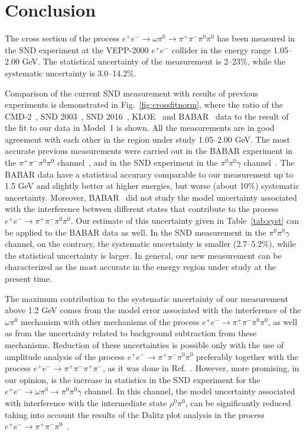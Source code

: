 \documentclass[twocolumn,aps,prd,floatfix,nofootinbib,superscriptaddress]{revtex4-2}
\begin{document}
\section{Conclusion}

The cross section of the process \( e^+e^- \to \omega\pi^0 \to \pi^+\pi^-\pi^0\pi^0 \) has been measured in the SND experiment at the VEPP-2000 $e^+e^-$ collider in the energy range 1.05--2.00 GeV.
The statistical uncertainty of the measurement is 2--23\%, while the systematic uncertainty is 3.0--14.2\%.

Comparison of the current SND measurement with results of previous experiments is demonstrated in Fig.~\ref{fig:crossfitnorm}, where the ratio of the CMD-2~\cite{cmd03}, SND 2003~\cite{snd2003}, SND 2016~\cite{snd2016}, KLOE~\cite{kloe08} and BABAR~\cite{babar17} data to the result of the fit to our data in Model~1 is shown.
All the measurements are in good agreement with each other in the region under study 1.05--2.00 GeV.
The most accurate previous measurements were carried out in the BABAR experiment in the $\pi^+\pi^-\pi^0\pi^0$ channel~\cite{babar17}, and in the SND experiment in the $\pi^0\pi^0\gamma$ channel~\cite{snd2016}.
The BABAR data have a statistical accuracy comparable to our measurement up to 1.5 GeV and slightly better at higher energies, but worse (about 10\%) systematic uncertainty.
Moreover, BABAR~\cite{babar17} did not study the model uncertainty associated with the interference between different states that contribute to the process \( e^+e^- \to \pi^+\pi^-\pi^0\pi^0 \).
Our estimate of this uncertainty given in Table~\ref{tab:syst} can be applied to the BABAR data as well.
In the SND measurement in the $\pi^0\pi^0\gamma$ channel, on the contrary, the systematic uncertainty is smaller (2.7--5.2\%), while the statistical uncertainty is larger.
In general, our new measurement can be characterized as the most accurate in the energy region under study at the present time.

The maximum contribution to the systematic uncertainty of our measurement above 1.2 GeV comes from the model error associated with the interference of the $\omega\pi^0$ mechanism with other mechanisms of the process \( e^+e^- \to \pi^+\pi^-\pi^0\pi^0 \), as well as from the uncertainty related to background subtraction from these mechanisms.
Reduction of these uncertainties is possible only with the use of amplitude analysis of the process \( e^+e^- \to \pi^+\pi^-\pi^0\pi^0 \) preferably together with the process \(e^+e^- \to \pi^+\pi^-\pi^+\pi^- \), as it was done in Ref.~\cite{kozyrev}.
However, more promising, in our opinion, is the increase in statistics in the SND experiment for the \( e^+e^- \to \omega\pi^0 \to \pi^0\pi^0\gamma \) channel.
In this channel, the model uncertainty associated with interference with the intermediate state $\rho^0\pi^0$, can be significantly reduced taking into account the results of the Dalitz plot analysis in the process \( e^+e^- \to \pi^+\pi^-\pi^0 \)~\cite{snd_3pi_3}.
\end{document}
